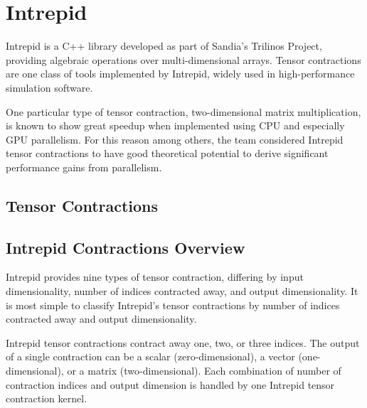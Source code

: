 \chapter{Intrepid}
Intrepid is a C++ library developed as part of Sandia's Trilinos Project,
providing algebraic operations over multi-dimensional arrays.  Tensor
contractions are one class of tools implemented by Intrepid, widely used in
high-performance simulation software.

One particular type of tensor contraction, two-dimensional matrix
multiplication, is known to show great speedup when implemented using CPU and
especially GPU parallelism.  For this reason among others, the team considered
Intrepid tensor contractions to have good theoretical potential to derive
significant performance gains from parallelism.

\section{Tensor Contractions}

\section{Intrepid Contractions Overview}
Intrepid provides nine types of tensor contraction, differing by input
dimensionality, number of indices contracted away, and output dimensionality.
It is most simple to classify Intrepid's tensor contractions by number of
indices contracted away and output dimensionality.

Intrepid tensor contractions contract away one, two, or three indices.  The
output of a single contraction can be a scalar (zero-dimensional), a vector
(one-dimensional), or a matrix (two-dimensional).  Each combination of number of
contraction indices and output dimension is handled by one Intrepid tensor
contraction kernel.

